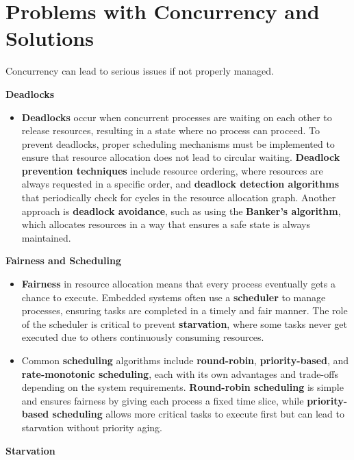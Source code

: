 \documentclass[
  14pt,
  a4paper,
  numbers=noendperiod,
  headinclude=true,
  footinclude=true,
  DIV=calc]{scrreprt}
\providecommand{\tightlist}{%
  \setlength{\itemsep}{0pt}\setlength{\parskip}{0pt}}\usepackage{longtable,booktabs,array}
\begin{document}
\section{Problems with Concurrency and
Solutions}\label{problems-with-concurrency-and-solutions}

Concurrency can lead to serious issues if not properly managed.

\textbf{Deadlocks}

\begin{itemize}
\tightlist
\item
  \textbf{Deadlocks} occur when concurrent processes are waiting on each
  other to release resources, resulting in a state where no process can
  proceed. To prevent deadlocks, proper scheduling mechanisms must be
  implemented to ensure that resource allocation does not lead to
  circular waiting. \textbf{Deadlock prevention techniques} include
  resource ordering, where resources are always requested in a specific
  order, and \textbf{deadlock detection algorithms} that periodically
  check for cycles in the resource allocation graph. Another approach is
  \textbf{deadlock avoidance}, such as using the \textbf{Banker's
  algorithm}, which allocates resources in a way that ensures a safe
  state is always maintained.
\end{itemize}

\textbf{Fairness and Scheduling}

\begin{itemize}
\item
  \textbf{Fairness} in resource allocation means that every process
  eventually gets a chance to execute. Embedded systems often use a
  \textbf{scheduler} to manage processes, ensuring tasks are completed
  in a timely and fair manner. The role of the scheduler is critical to
  prevent \textbf{starvation}, where some tasks never get executed due
  to others continuously consuming resources.
\item
  Common \textbf{scheduling} algorithms include \textbf{round-robin},
  \textbf{priority-based}, and \textbf{rate-monotonic scheduling}, each
  with its own advantages and trade-offs depending on the system
  requirements. \textbf{Round-robin scheduling} is simple and ensures
  fairness by giving each process a fixed time slice, while
  \textbf{priority-based scheduling} allows more critical tasks to
  execute first but can lead to starvation without priority aging.
\end{itemize}

\textbf{Starvation}
\end{document}
